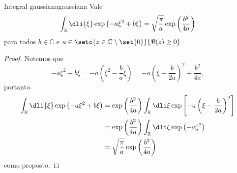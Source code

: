 \begin{lemma}{Integral gaussiana}{gaussiana}
    Vale
    \begin{equation*}
       \int_{\mathbb{R}} \dli{\xi} \exp\left(-a \xi^2 + b \xi\right) = \sqrt{\frac{\pi}{a}} \exp\left(\frac{b^2}{4a}\right)
    \end{equation*}
    para todos \(b\in \mathbb{C}\) e \(a \in \setc{z \in \mathbb{C}\setminus\set{0}}{\Re(z) \geq 0}\).
\end{lemma}
\begin{proof}
    Notemos que
    \begin{equation*}
       -a \xi^2 + b \xi = - a \left(\xi^2 - \frac{b}{a}\xi\right) = -a \left(\xi - \frac{b}{2a}\right)^2 + \frac{b^2}{4a},
    \end{equation*}
    portanto
    \begin{align*}
       \int_{\mathbb{R}} \dli{\xi} \exp\left(-a \xi^2 + b \xi\right) &= \exp\left(\frac{b^2}{4a}\right) \int_{\mathbb{R}} \dli\xi \exp\left[-a \left(\xi - \frac{b}{2a}\right)^2\right]\\
                                                                     &= \exp\left(\frac{b^2}{4a}\right) \int_{\mathbb{R}} \dli\zeta \exp\left(-a \zeta^2\right)\\
                                                                     &= \sqrt{\frac{\pi}{a}} \exp\left(\frac{b^2}{4a}\right)
    \end{align*}
    como proposto.
\end{proof}

